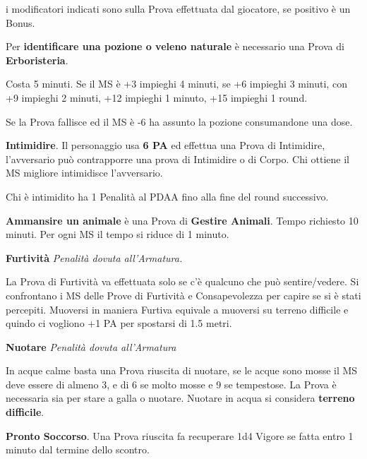 \documentclass[12pt,a4paper,twoside,openany]{book}
\begin{document}
\begin{multicols}{2}
i modificatori indicati sono sulla Prova effettuata dal giocatore, se positivo è un Bonus.

\medskip

Per \textbf{identificare una pozione o veleno naturale} è necessario una Prova di \textbf{Erboristeria}.

Costa 5 minuti. Se il MS è +3 impieghi 4 minuti, se +6 impieghi 3 minuti, con +9 impieghi 2 minuti, +12 impieghi 1 minuto, +15 impieghi 1 round.

Se la Prova fallisce ed il MS è -6 ha assunto la pozione consumandone una dose.

\medskip

\textbf{Intimidire}. Il personaggio usa \textbf{6 PA} ed effettua una Prova di Intimidire, l'avversario può contrapporre una prova di Intimidire o di Corpo. Chi ottiene il MS migliore intimidisce l'avversario.

Chi è intimidito ha 1 Penalità al PDAA fino alla fine del round successivo.

\medskip

\textbf{Ammansire un animale} è una Prova di \textbf{Gestire Animali}. Tempo richiesto 10 minuti. Per ogni MS il tempo si riduce di 1 minuto.

\medskip

\textbf{Furtività}  \textit{Penalità dovuta all'Armatura.}

La Prova di Furtività va effettuata solo se c'è qualcuno che può sentire/vedere. Si confrontano i MS delle Prove di Furtività e Consapevolezza per capire se si è stati percepiti. Muoversi in maniera Furtiva equivale a muoversi su terreno difficile e quindo ci vogliono +1 PA per spostarsi di 1.5 metri.

\medskip

\textbf{Nuotare} \textit{Penalità dovuta all'Armatura}

In acque calme basta una Prova riuscita di nuotare, se le acque sono mosse il MS deve essere di almeno 3, e di 6 se molto mosse e 9 se tempestose. La Prova è necessaria sia per stare a galla o nuotare. Nuotare in acqua si considera \textbf{terreno difficile}.

\medskip

\textbf{Pronto Soccorso}\hypertarget{prontosoccorso}{}\label{prontosoccorso}. Una Prova riuscita fa recuperare 1d4 Vigore se fatta entro 1 minuto dal termine dello scontro.


\end{multicols}
\end{document}
